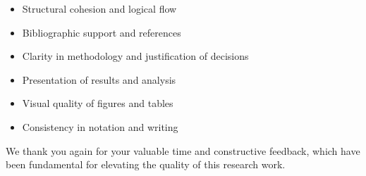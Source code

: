 \documentclass[runningheads]{llncs}
\begin{document}
\begin{itemize}
  \item Structural cohesion and logical flow
  \item Bibliographic support and references
  \item Clarity in methodology and justification of decisions
  \item Presentation of results and analysis
  \item Visual quality of figures and tables
  \item Consistency in notation and writing
\end{itemize}

We thank you again for your valuable time and constructive feedback,
which have been fundamental for elevating the quality of
this research work.
\end{document}
